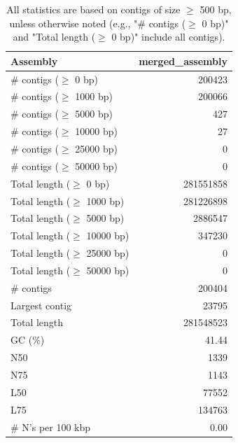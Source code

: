 \documentclass[12pt,a4paper]{article}
\begin{document}
\begin{table}[ht]
\begin{center}
\caption{All statistics are based on contigs of size $\geq$ 500 bp, unless otherwise noted (e.g., "\# contigs ($\geq$ 0 bp)" and "Total length ($\geq$ 0 bp)" include all contigs).}
\begin{tabular}{|l*{1}{|r}|}
\hline
Assembly & merged\_assembly \\ \hline
\# contigs ($\geq$ 0 bp) & 200423 \\ \hline
\# contigs ($\geq$ 1000 bp) & 200066 \\ \hline
\# contigs ($\geq$ 5000 bp) & 427 \\ \hline
\# contigs ($\geq$ 10000 bp) & 27 \\ \hline
\# contigs ($\geq$ 25000 bp) & 0 \\ \hline
\# contigs ($\geq$ 50000 bp) & 0 \\ \hline
Total length ($\geq$ 0 bp) & 281551858 \\ \hline
Total length ($\geq$ 1000 bp) & 281226898 \\ \hline
Total length ($\geq$ 5000 bp) & 2886547 \\ \hline
Total length ($\geq$ 10000 bp) & 347230 \\ \hline
Total length ($\geq$ 25000 bp) & 0 \\ \hline
Total length ($\geq$ 50000 bp) & 0 \\ \hline
\# contigs & 200404 \\ \hline
Largest contig & 23795 \\ \hline
Total length & 281548523 \\ \hline
GC (\%) & 41.44 \\ \hline
N50 & 1339 \\ \hline
N75 & 1143 \\ \hline
L50 & 77552 \\ \hline
L75 & 134763 \\ \hline
\# N's per 100 kbp & 0.00 \\ \hline
\end{tabular}
\end{center}
\end{table}
\end{document}
